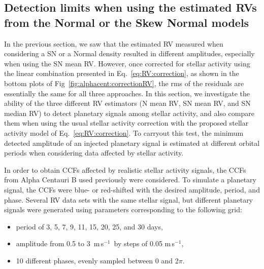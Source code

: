 \documentclass{aa}
\def\ms{\hbox{\,m\,s$^{-1}$}}         %
\begin{document}
\subsection{Detection limits when using the estimated RVs from the Normal or the Skew Normal models} \label{sec:detect_limits}

In the previous section, we saw that the estimated RV measured when considering a SN or a Normal density resulted in different amplitudes, especially when using the SN mean RV. 
However, once corrected for stellar activity using the linear combination presented in Eq.~\eqref{eq:RV:correction}, as shown in the bottom plots of Fig~\ref{fig:alphacent:correctionRV}, the rms of the residuals are essentially the same for all three approaches.
In this section, we investigate the ability of the three different RV estimators (N mean RV, SN mean RV, and SN median RV) to detect planetary signals among stellar activity, and also compare them when using the usual stellar activity correction with the proposed stellar activity model of Eq.~\eqref{eq:RV:correction}.
To carryout this test, the minimum detected amplitude of an injected planetary signal is estimated at different orbital periods when considering data affected by stellar activity.

In order to obtain CCFs affected by realistic stellar activity signals, the CCFs from Alpha Centauri B used previously were considered. 
To simulate a planetary signal, the CCFs were blue- or red-shifted with the desired amplitude, period, and phase.
Several RV data sets with the same stellar signal, but different planetary signals were generated using parameters corresponding to the following grid:
\begin{itemize}
\item period of 3, 5, 7, 9, 11, 15, 20, 25, and 30 days,
\item amplitude from 0.5 to 3 \ms\, by steps of 0.05\,\ms,
\item 10 different phases, evenly sampled between 0 and 2$\pi$.
\end{itemize}
\end{document}
